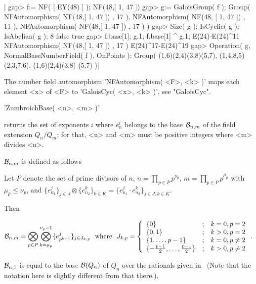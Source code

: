 |    gap> f:= NF( [ EY(48) ] );
    NF(48,[ 1, 47 ])
    gap> g:= GaloisGroup( f );
    Group( NFAutomorphism( NF(48,[ 1, 47 ]) , 17 ), NFAutomorphism( NF(48,
    [ 1, 47 ]) , 11 ), NFAutomorphism( NF(48,[ 1, 47 ]) , 17 ) )
    gap> Size( g ); IsCyclic( g ); IsAbelian( g );
    8
    false
    true
    gap> f.base[1]; g.1; f.base[1] ^ g.1;
    E(24)-E(24)^11
    NFAutomorphism( NF(48,[ 1, 47 ]) , 17 )
    E(24)^17-E(24)^19
    gap> Operation( g, NormalBaseNumberField( f ), OnPoints );
    Group( (1,6)(2,4)(3,8)(5,7), (1,4,8,5)(2,3,7,6), (1,6)(2,4)(3,8)
    (5,7) )|

The number field automorphism 'NFAutomorphism( <F>, <k> )' maps each
element <x> of <F> to 'GaloisCyc( <x>, <k> )', see "GaloisCyc".


'ZumbroichBase( <n>, <m> )'

returns the set of exponents $i$ where $e_n^i$ belongs to the base
${\cal{B}}_{n,m}$ of the field extension $Q_n/Q_m$; for that, <n> and <m>
must be positive integers where <m> divides <n>.

${\cal{B}}_{n,m}$ is defined as follows\:

Let $P$ denote the set of prime divisors of $n$,
$n = \prod_{p\in P} p^{\nu_p}$,
$m = \prod_{p\in P} p^{\mu_p}$ with $\mu_p \leq \nu_p$, and
$\{ e_{n_1}^j\}_{j\in J} \otimes \{ e_{n_2}^k\}_{k\in K} = 
\{ e_{n_1}^j \cdot e_{n_2}^k\}_{j\in J, k\in K}$.

Then

\[ {\cal{B}}_{n,m} = \bigotimes_{p\in P}
         \bigotimes_{k=\mu_p}^{\nu_p-1} \{ e_{p^{k+1}}^j\}_{j\in J_{k,p}}
\mbox{\rm\ \ where\ \ }
 J_{k,p} = \left\{ \begin{array}{lcl} \{ 0 \} & ; & k=0, p=2 \\
                        \{ 0, 1 \} & ; & k > 0, p=2 \\
                        \{ 1, \ldots, p-1 \} & ; & k = 0, p\not= 2 \\
                        \{ -\frac{p-1}{2}, \ldots, \frac{p-1}{2} \} & ; &
                                 k > 0, p\not= 2
                     \end{array}\right. . \]

${\cal{B}}_{n,1}$ is equal to the base ${\cal{B}}(Q_n)$ of $Q_n$ over the
rationals given in~\cite{Zum89}
(Note that the notation here is slightly different from that there.).

